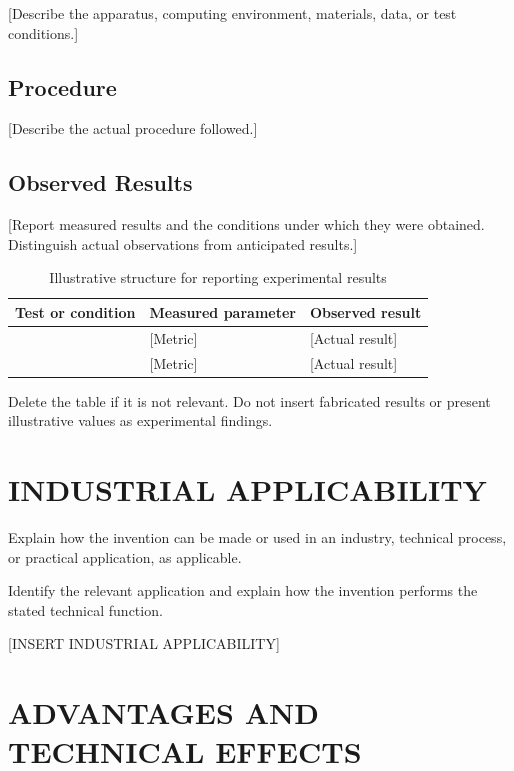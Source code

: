 \documentclass[12pt,a4paper]{article}
\begin{document}
[Describe the apparatus, computing environment,
materials, data, or test conditions.]

\subsection{Procedure}

[Describe the actual procedure followed.]

\subsection{Observed Results}

[Report measured results and the conditions under which
they were obtained. Distinguish actual observations from
anticipated results.]

\begin{table}[H]
\centering
\caption{Illustrative structure for reporting experimental results}
\begin{tabular}{|p{45mm}|p{35mm}|p{45mm}|}
\hline
\textbf{Test or condition} &
\textbf{Measured parameter} &
\textbf{Observed result} \\
\hline
[Condition 1] & [Metric] & [Actual result] \\
\hline
[Condition 2] & [Metric] & [Actual result] \\
\hline
\end{tabular}
\end{table}

Delete the table if it is not relevant. Do not insert
fabricated results or present illustrative values as
experimental findings.

\section{INDUSTRIAL APPLICABILITY}

Explain how the invention can be made or used in an
industry, technical process, or practical application,
as applicable.

Identify the relevant application and explain how the
invention performs the stated technical function.

[INSERT INDUSTRIAL APPLICABILITY]

\section{ADVANTAGES AND TECHNICAL EFFECTS}
\end{document}
